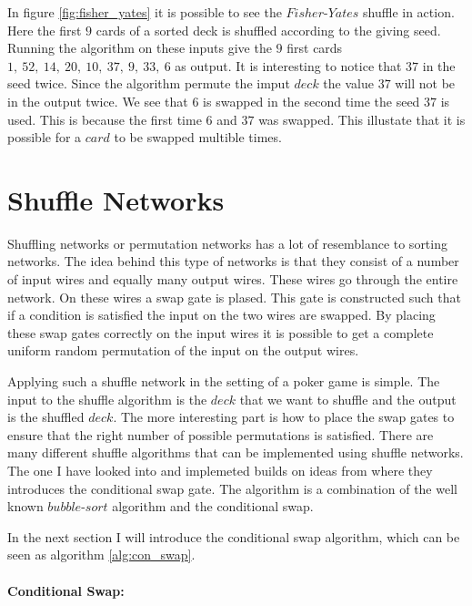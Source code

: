 \documentclass[twoside,11pt,openright]{report}
\begin{document}
In figure \ref{fig:fisher_yates} it is possible to see the $Fisher\text{-}Yates$ shuffle in action. Here the first $9$ cards of a sorted deck is shuffled according to the giving seed. Running the algorithm on these inputs give the $9$ first cards $1,~52,~14,~20,~10,~37,~9,~33,~6$ as output. It is interesting to notice that $37$ in the seed twice. Since the algorithm permute the imput $deck$ the value $37$ will not be in the output twice. We see that $6$ is swapped in the second time the seed $37$ is used. This is because the first time $6$ and $37$ was swapped. This illustate that it is possible for a $card$ to be swapped multible times.


\section{Shuffle Networks}
Shuffling networks or permutation networks has a lot of resemblance to sorting networks. The idea behind this type of networks is that they consist of a number of input wires and equally many output wires. These wires go through the entire network. On these wires a swap gate is plased. This gate is constructed such that if a condition is satisfied the input on the two wires are swapped. By placing these swap gates correctly on the input wires it is possible to get a complete uniform random permutation of the input on the output wires.

Applying such a shuffle network in the setting of a poker game is simple. The input to the shuffle algorithm is the $deck$ that we want to shuffle and the output is the shuffled $deck$. The more interesting part is how to place the swap gates to ensure that the right number of possible permutations is satisfied. There are many different shuffle algorithms that can be implemented using shuffle networks. The one I have looked into and implemeted builds on ideas from  where they introduces the conditional swap gate. The algorithm is a combination of the well known $bubble\text{-}sort$ algorithm and the conditional swap.

\bigskip

In the next section I will introduce the conditional swap algorithm, which can be seen as algorithm \ref{alg:con_swap}.

\bigskip

\paragraph{Conditional Swap:}
\label{sec:con_swap}
\end{document}
